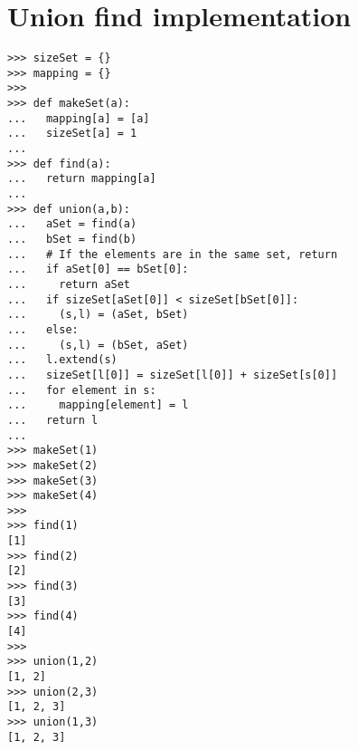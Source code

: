 \section{Union find implementation}
\label{sec:unionfindimpl}

\begin{verbatim}
>>> sizeSet = {}
>>> mapping = {}
>>> 
>>> def makeSet(a):
...   mapping[a] = [a]
...   sizeSet[a] = 1
... 
>>> def find(a):
...   return mapping[a]
... 
>>> def union(a,b):
...   aSet = find(a)
...   bSet = find(b)
...   # If the elements are in the same set, return
...   if aSet[0] == bSet[0]:
...     return aSet
...   if sizeSet[aSet[0]] < sizeSet[bSet[0]]:
...     (s,l) = (aSet, bSet)
...   else:
...     (s,l) = (bSet, aSet)
...   l.extend(s)
...   sizeSet[l[0]] = sizeSet[l[0]] + sizeSet[s[0]]
...   for element in s:
...     mapping[element] = l
...   return l
... 
>>> makeSet(1)
>>> makeSet(2)
>>> makeSet(3)
>>> makeSet(4)
>>> 
>>> find(1)
[1]
>>> find(2)
[2]
>>> find(3)
[3]
>>> find(4)
[4]
>>> 
>>> union(1,2)
[1, 2]
>>> union(2,3)
[1, 2, 3]
>>> union(1,3)
[1, 2, 3]
\end{verbatim}
